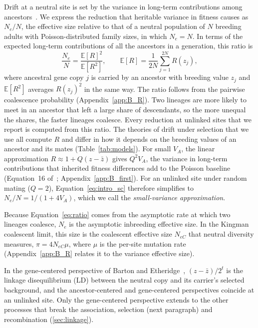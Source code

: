 \documentclass{article}
\begin{document}
Drift at a neutral site is set by the variance in long-term contributions among ancestors~\cite{wray1990}. We express the reduction that heritable variance in fitness causes as $N_e/N$, the effective size relative to that of a neutral population of $N$ breeding adults with Poisson-distributed family sizes, in which $N_e = N$. In terms of the expected long-term contributions of all the ancestors in a generation, this ratio is
\begin{equation}
    \frac{N_e}{N} = \frac{\mathbb{E}[R]^2}{\mathbb{E}[R^2]}, \qquad \mathbb{E}[R] = \frac{1}{2N}\sum_{j=1}^{2N} R(z_j), \label{eq:ratio}
\end{equation}
where ancestral gene copy $j$ is carried by an ancestor with breeding value $z_j$ and $\mathbb{E}[R^2]$ averages $R(z_j)^2$ in the same way. The ratio follows from the pairwise coalescence probability (Appendix~\ref{app:B_R}). Two lineages are more likely to meet in an ancestor that left a large share of descendants, so the more unequal the shares, the faster lineages coalesce. Every reduction at unlinked sites that we report is computed from this ratio. The theories of drift under selection that we use all compute $R$ and differ in how it depends on the breeding values of an ancestor and its mates (Table~\ref{tab:models}). For small $V_A$, the linear approximation $R \approx 1 + Q(z - \bar{z})$ gives $Q^2V_A$, the variance in long-term contributions that inherited fitness differences add to the Poisson baseline~\cite{robertson1961,nei1966,woolliams1993} (Equation~16 of~\cite{santiago1995}; Appendix~\ref{app:B_first}). For an unlinked site under random mating ($Q = 2$), Equation~\eqref{eq:intro_sc} therefore simplifies to $N_e/N = 1/(1 + 4V_A)$, which we call the \emph{small-variance approximation}.

Because Equation~\eqref{eq:ratio} comes from the asymptotic rate at which two lineages coalesce, $N_e$ is the asymptotic inbreeding effective size. In the Kingman coalescent limit, this size is the coalescent effective size $N_{eC}$ that neutral diversity measures, $\pi = 4N_{eC}\mu$, where $\mu$ is the per-site mutation rate (Appendix~\ref{app:B_R} relates it to the variance effective size).

In the gene-centered perspective of Barton and Etheridge~\cite{barton2011}, $(z - \bar{z})/2^t$ is the linkage disequilibrium (LD) between the neutral copy and its carrier's selected background, and the ancestor-centered and gene-centered perspectives coincide at an unlinked site. Only the gene-centered perspective extends to the other processes that break the association, selection (next paragraph) and recombination (\autoref{sec:linkage}).
\end{document}
